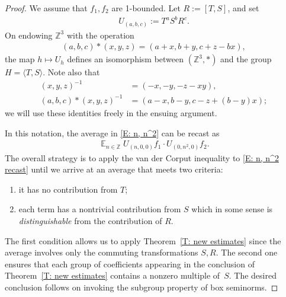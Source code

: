 \documentclass[11pt]{amsart}
\theoremstyle{definition}
\DeclareMathOperator*{\oE}{\overline{\mathbb{E}}}
\DeclareMathOperator*{\E}{\mathbb{E}}
\newcommand{\Z}{{\mathbb Z}}
\newcommand{\norm}[1]{\left\Vert #1\right\Vert}
\newcommand{\inv}{^{-1}}
\newcommand{\1}{{\mathbf{1}}}
\newcommand{\abs}[1]{\mathopen{}\left| #1\mathclose{}\right|}
\begin{document}
\begin{proof}
We assume that $f_1, f_2$ are 1-bounded.
Let $R:=[T,S]$, and set
\begin{align*}
    U_{(a,b,c)}:=T^{a}S^{b}R^{c}.
\end{align*}
On endowing $\Z^3$ with the operation
\begin{align*}
    (a,b,c)*(x,y,z) = (a + x, b + y, c + z - bx),
\end{align*}
the map $h\mapsto U_h$ defines an isomorphism between $(\Z^3, *)$ and the group $H=\langle T, S\rangle$. Note also that
\begin{align*}
    (x,y,z)\inv &= (-x,-y,-z - xy),\\
    (a,b,c)*(x,y,z)\inv &= (a - x, b - y, c -z +(b-y)x);
\end{align*}
we will use these identities freely in the ensuing argument.

In this notation, the average in \eqref{E: n, n^2} can be recast as
\begin{align}\label{E: n, n^2 recast}
    \E_{n\in\Z} U_{(n,0,0)}f_1\cdot U_{(0,n^2,0)}f_2.
\end{align}
The overall strategy is to apply the van der Corput inequality
to \eqref{E: n, n^2 recast} until we arrive at an average that meets two criteria:
\begin{enumerate}
    \item it has no contribution from $T$;
    \item each term has a nontrivial contribution from $S$ which in some sense is \textit{distinguishable} from the contribution of $R$.
\end{enumerate}
The first condition allows us to apply Theorem~\ref{T: new estimates} since the average involves only the commuting transformations $S, R$. The second one ensures that each group of coefficients appearing in the conclusion of Theorem~\ref{T: new estimates} contains a nonzero multiple of~$S$. The desired conclusion follows on invoking the subgroup property of box seminorms. 



\end{proof}
\end{document}
